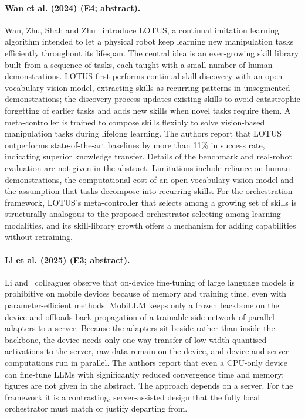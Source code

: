 \documentclass[10pt,a4paper]{article}
\begin{document}
\paragraph{Wan et al. (2024) (E4; abstract).} Wan, Zhu, Shah and Zhu~\cite{Wan2024} introduce LOTUS, a continual imitation learning algorithm intended to let a physical robot keep learning new manipulation tasks efficiently throughout its lifespan. The central idea is an ever-growing skill library built from a sequence of tasks, each taught with a small number of human demonstrations. LOTUS first performs continual skill discovery with an open-vocabulary vision model, extracting skills as recurring patterns in unsegmented demonstrations; the discovery process updates existing skills to avoid catastrophic forgetting of earlier tasks and adds new skills when novel tasks require them. A meta-controller is trained to compose skills flexibly to solve vision-based manipulation tasks during lifelong learning. The authors report that LOTUS outperforms state-of-the-art baselines by more than 11\% in success rate, indicating superior knowledge transfer. Details of the benchmark and real-robot evaluation are not given in the abstract. Limitations include reliance on human demonstrations, the computational cost of an open-vocabulary vision model and the assumption that tasks decompose into recurring skills. For the orchestration framework, LOTUS's meta-controller that selects among a growing set of skills is structurally analogous to the proposed orchestrator selecting among learning modalities, and its skill-library growth offers a mechanism for adding capabilities without retraining.

\paragraph{Li et al. (2025) (E3; abstract).} Li and~\cite{Li2025} colleagues observe that on-device fine-tuning of large language models is prohibitive on mobile devices because of memory and training time, even with parameter-efficient methods. MobiLLM keeps only a frozen backbone on the device and offloads back-propagation of a trainable side network of parallel adapters to a server. Because the adapters sit beside rather than inside the backbone, the device needs only one-way transfer of low-width quantised activations to the server, raw data remain on the device, and device and server computations run in parallel. The authors report that even a CPU-only device can fine-tune LLMs with significantly reduced convergence time and memory; figures are not given in the abstract. The approach depends on a server. For the framework it is a contrasting, server-assisted design that the fully local orchestrator must match or justify departing from.
\end{document}
